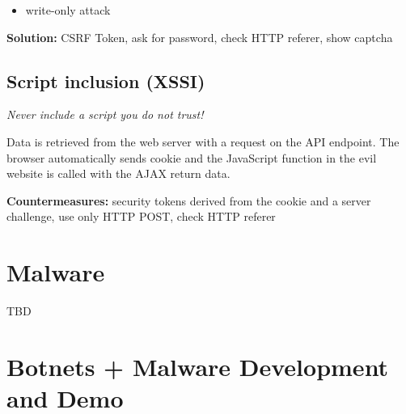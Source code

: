 \documentclass[fs, footer]{latex4ei}
\begin{document}
\begin{multicols*}{4}
\begin{itemize}
  \item write-only attack
\end{itemize}

\textbf{Solution:} CSRF Token, ask for password, check HTTP referer, show captcha

\subsection{Script inclusion (XSSI)}

\emph{Never include a script you do not trust!}

Data is retrieved from the web server with a request on the API endpoint. The browser automatically sends cookie and the JavaScript function in the evil website is called with the AJAX return data.

\textbf{Countermeasures:} security tokens derived from the cookie and a server challenge, use only HTTP POST, check HTTP referer

\section{Malware}
TBD

\section{Botnets + Malware Development and Demo}
 
\end{multicols*}
\end{document}
